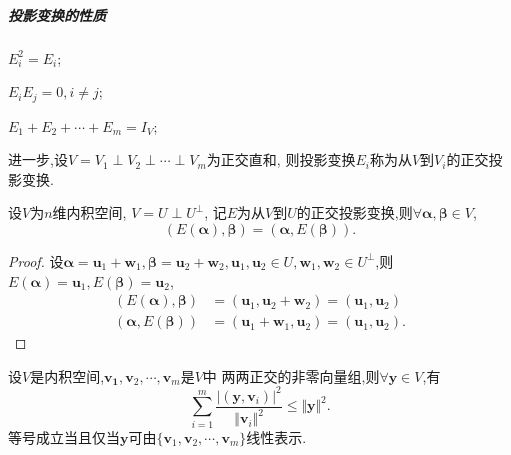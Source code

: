 \subparagraph{\color{ecolor}投影变换的性质}
\begin{asparaenum}[(1)]

\item $E_i^2=E_i$;

\item $E_iE_j=0, i\neq j$;

\item $E_1+E_2+\cdots+E_m=I_V$;
\end{asparaenum}

进一步,设$V=V_1\perp V_2\perp\cdots\perp V_m$为正交直和,
则投影变换$E_i$称为从$V$到$V_i$的{\heiti 正交投影变换}.

\begin{theory}
设$V$为$n$维内积空间, $V=U\perp U^{\perp}$, 
记$E$为从$V$到$U$的正交投影变换,则$\forall \bm{\alpha}, \bm{\beta} \in V$,
\[
(E(\bm{\alpha}),\bm{\beta}) = (\bm{\alpha},E(\bm{\beta})).
\]
\end{theory}

\begin{proof}
设$\bm{\alpha}=\bm{u}_1+\bm{w}_1, \bm{\beta}=\bm{u}_2+\bm{w}_2, 
\bm{u}_1,\bm{u}_2\in U, \bm{w}_1,\bm{w}_2\in U^{\perp}$,则
$E(\bm{\alpha})=\bm{u}_1, E(\bm{\beta})=\bm{u}_2$,
\begin{align*}
  (E(\bm{\alpha}),\bm{\beta}) & = (\bm{u}_1,\bm{u}_2+\bm{w}_2) = (\bm{u}_1,\bm{u}_2)\\
  (\bm{\alpha},E(\bm{\beta})) & = (\bm{u}_1+\bm{w}_1,\bm{u}_2) = (\bm{u}_1,\bm{u}_2).
\end{align*}
\end{proof}

\begin{theorem}[Bessel不等式]
  设$V$是内积空间,$\bm{\bm{v}_1},\bm{v}_2,\cdots,\bm{v}_m$是$V$中
  两两正交的非零向量组,则$\forall \bm{y}\in V$,有
  \[
  \sum_{i=1}^m\frac{|(\bm{y},\bm{v}_i)|^2}{\Vert\bm{v}_i\Vert^2} \leq \Vert\bm{y}\Vert^2. 
  \]
  等号成立当且仅当$\bm{y}$可由$\{\bm{v}_1,\bm{v}_2,\cdots,\bm{v}_m\}$线性表示.
\end{theorem}


